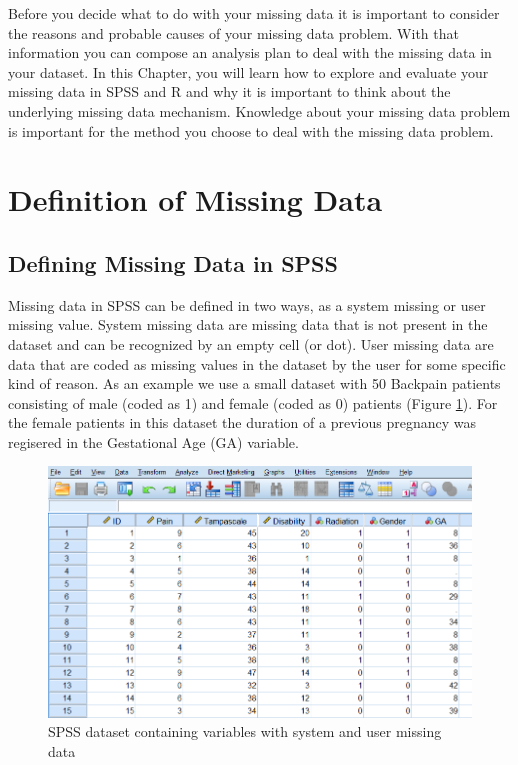\documentclass[]{book}
\begin{document}
Before you decide what to do with your missing data it is important to
consider the reasons and probable causes of your missing data problem.
With that information you can compose an analysis plan to deal with the
missing data in your dataset. In this Chapter, you will learn how to
explore and evaluate your missing data in SPSS and R and why it is
important to think about the underlying missing data mechanism.
Knowledge about your missing data problem is important for the method
you choose to deal with the missing data problem.

\section{Definition of Missing Data}\label{definition-of-missing-data}

\subsection{Defining Missing Data in
SPSS}\label{defining-missing-data-in-spss}

Missing data in SPSS can be defined in two ways, as a system missing or
user missing value. System missing data are missing data that is not
present in the dataset and can be recognized by an empty cell (or dot).
User missing data are data that are coded as missing values in the
dataset by the user for some specific kind of reason. As an example we
use a small dataset with 50 Backpain patients consisting of male (coded
as 1) and female (coded as 0) patients (Figure \ref{fig:fig2-1}). For
the female patients in this dataset the duration of a previous pregnancy
was regisered in the Gestational Age (GA) variable.

\begin{figure}

{\centering \includegraphics[width=0.9\linewidth]{images/fig2.1} 

}

\caption{SPSS dataset containing variables with system and user missing data}\label{fig:fig2-1}
\end{figure}
\end{document}
